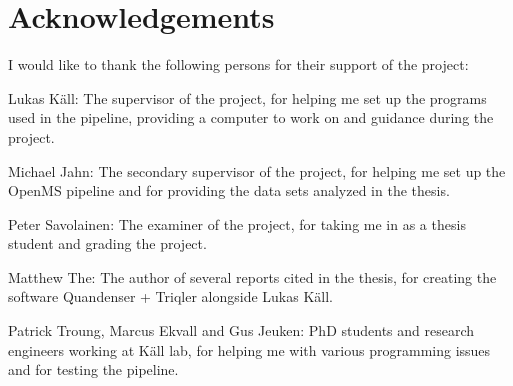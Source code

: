 \section{Acknowledgements}

I would like to thank the following persons for their support of the project:

Lukas Käll: The supervisor of the project, for helping me set up the programs used in the pipeline, providing a computer to work on and guidance during the project.

Michael Jahn: The secondary supervisor of the project, for helping me set up the OpenMS pipeline and for providing the data sets analyzed in the thesis.

Peter Savolainen: The examiner of the project, for taking me in as a thesis student and grading the project.

Matthew The: The author of several reports cited in the thesis, for creating the software Quandenser + Triqler alongside Lukas Käll.

Patrick Troung, Marcus Ekvall and Gus Jeuken: PhD students and research engineers working at Käll lab, for helping me with various programming issues and for testing the pipeline.
